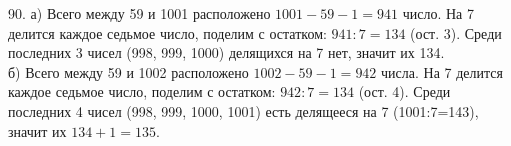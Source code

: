 90. а) Всего между 59 и 1001 расположено $1001-59-1=941$ число. На 7 делится каждое седьмое число, поделим с остатком: $941:7=134$ (ост. 3). Среди последних 3 чисел (998, 999, 1000) делящихся на 7 нет, значит их 134.\\
б) Всего между 59 и 1002 расположено $1002-59-1=942$ числа. На 7 делится каждое седьмое число, поделим с остатком: $942:7=134$ (ост. 4). Среди последних 4 чисел (998, 999, 1000, 1001) есть делящееся на 7 (1001:7=143), значит их $134+1=135.$\\
